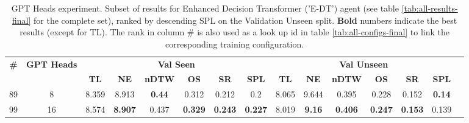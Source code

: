 \begin{table}
\centering
\caption{\label{tab:e_dt_heads}GPT Heads experiment. Subset of results for Enhanced Decision Transformer ('E-DT') agent (see table \ref{tab:all-results-final} for the complete set), ranked by descending SPL on the Validation Unseen split. \textbf{Bold} numbers indicate the best results (except for TL). The rank in column \# is also used as a look up id in table \ref{tab:all-configs-final} to link the corresponding training configuration.}
\begin{tabular}{@{\hskip3pt}c@{\hskip3pt}c@{\hskip3pt}c@{\hskip3pt}c@{\hskip3pt}c@{\hskip3pt}c@{\hskip3pt}c@{\hskip3pt}c@{\hskip3pt}c@{\hskip3pt}c@{\hskip3pt}c@{\hskip3pt}c@{\hskip3pt}c@{\hskip3pt}c@{\hskip3pt}c}
\toprule
                                  \textbf{\#} & \textbf{GPT Heads} & \multicolumn{6}{c}{\textbf{Val Seen}} & \multicolumn{6}{c}{\textbf{Val Unseen}} \\
\cmidrule(l){3-8}\cmidrule(l){9-14}\textbf{~} &         \textbf{~} &       \textbf{TL} &     \textbf{NE} &  \textbf{nDTW} &     \textbf{OS} &     \textbf{SR} &    \textbf{SPL} &         \textbf{TL} &    \textbf{NE} &   \textbf{nDTW} &     \textbf{OS} &     \textbf{SR} &   \textbf{SPL} \\
\midrule
                                           89 &                  8 &             8.359 &           8.913 &  \textbf{0.44} &           0.312 &           0.212 &             0.2 &               8.065 &          9.644 &           0.395 &           0.228 &           0.152 &  \textbf{0.14} \\
                                           99 &                 16 &             8.574 &  \textbf{8.907} &          0.437 &  \textbf{0.329} &  \textbf{0.243} &  \textbf{0.227} &               8.019 &  \textbf{9.16} &  \textbf{0.406} &  \textbf{0.247} &  \textbf{0.153} &          0.139 \\
\bottomrule
\end{tabular}
\end{table}
